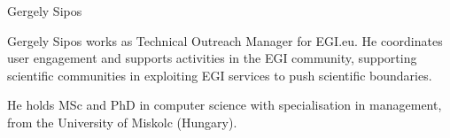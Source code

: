 \begin{participant}[type=R,PM=,gender=male]{Gergely Sipos}

    Gergely Sipos works as Technical Outreach Manager for EGI.eu. 
    He coordinates user engagement and supports activities in the EGI community, 
    supporting scientific communities in exploiting EGI services to push scientific 
    boundaries. 

    He holds MSc and PhD in computer science with specialisation in management, 
    from the University of Miskolc (Hungary).

\end{participant}

